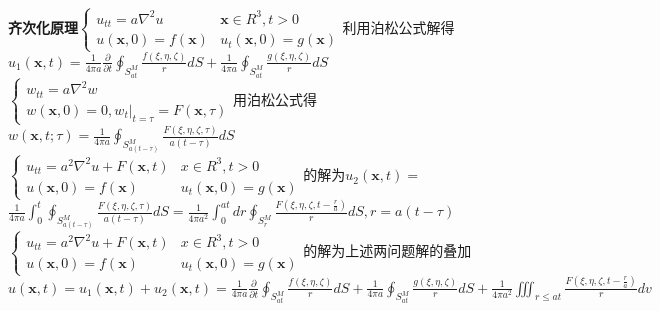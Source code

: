 \documentclass[10pt,a4paper]{article}
\begin{document}
\begin{multicols}{2}
\tiny\textbf{齐次化原理}$\left\{\begin{array}{ll}u_{tt}=a\nabla^2u&\bm{x}\in R^3,t>0\\u(\bm{x},0)=f(\bm{x})&u_t(\bm{x},0)=g(\bm{x})\end{array}\right.$利用泊松公式解得\\
\indent$u_1(\bm{x},t)=\frac{1}{4\pi a}\frac{\partial}{\partial t}\oint_{S_{at}^M}\frac{f(\xi,\eta,\zeta)}{r}dS+\frac{1}{4\pi a}\oint_{S_{at}^M}\frac{g(\xi,\eta,\zeta)}{r}dS$\\
\indent\indent$\left\{\begin{array}{l}w_{tt}=a\nabla^2w\\w(\bm{x},0)=0,w_t|_{t=\tau}=F(\bm{x},\tau)\end{array}\right.$用泊松公式得$w(\bm{x},t;\tau)=\frac{1}{4\pi a}\oint_{S_{a(t-\tau)}^M}\frac{F(\xi,\eta,\zeta,\tau)}{a(t-\tau)}dS$\\
$\left\{\begin{array}{ll}u_{tt}=a^2\nabla^2u+F(\bm{x},t)&x\in R^3,t>0\\u(\bm{x},0)=f(\bm{x})&u_t(\bm{x},0)=g(\bm{x})\end{array}\right.$的解为$u_2(\bm{x},t)=$\\
\indent\indent$\frac{1}{4\pi a}\int_0^t\oint_{S_{a(t-\tau)}^M}\frac{F(\xi,\eta,\zeta,\tau)}{a(t-\tau)}dS=\frac{1}{4\pi a^2}\int_0^{at}dr\oint_{S_r^M}\frac{F(\xi,\eta,\zeta,t-\frac{r}{a})}{r}dS,r=a(t-\tau)$\\
\indent$\left\{\begin{array}{ll}u_{tt}=a^2\nabla^2u+F(\bm{x},t)&x\in R^3,t>0\\u(\bm{x},0)=f(\bm{x})&u_t(\bm{x},0)=g(\bm{x})\end{array}\right.$的解为上述两问题解的叠加\\
\indent$u(\bm{x},t)=u_1(\bm{x},t)+u_2(\bm{x},t)=\frac{1}{4\pi a}\frac{\partial}{\partial t}\oint_{S_{at}^M}\frac{f(\xi,\eta,\zeta)}{r}dS+\frac{1}{4\pi a}\oint_{S_{at}^M}\frac{g(\xi,\eta,\zeta)}{r}dS+\frac{1}{4\pi a^2}\iiint_{r\leq at}\frac{F(\xi,\eta,\zeta,t-\frac{r}{a})}{r}dv$\scriptsize
\end{multicols}
\end{document}
